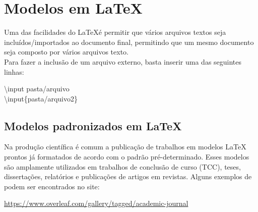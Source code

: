\section{Modelos em \LaTeX}

\begin{frame}
    Uma das facilidades do \LaTeX é  permitir que vários arquivos textos seja incluídos/importados ao documento final, permitindo que um mesmo documento seja composto por vários arquivos texto.\\
    Para fazer a inclusão de um arquivo externo, basta inserir uma das seguintes linhas:

\vspace{1cm}
\begin{center}
    {\ttfamily \textbackslash input {pasta/arquivo}}\\
    {\ttfamily \textbackslash input\{pasta/arquivo2\}}
\end{center}

\end{frame}


\begin{frame}
\subsection*{Modelos padronizados em \LaTeX} %

Na produção científica é comum a publicação de trabalhos em modelos \LaTeX~ prontos já formatados de acordo com o padrão pré-determinado. Esses modelos são amplamente utilizados em trabalhos de conclusão de curso (TCC), teses, dissertações, relatórios e publicações de artigos em revistas. Alguns exemplos de podem ser encontrados no site:

\begin{center}
\url{https://www.overleaf.com/gallery/tagged/academic-journal}
\end{center}
\end{frame}









